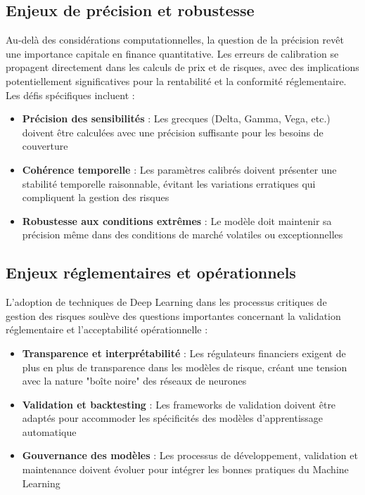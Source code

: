 \subsection{Enjeux de précision et robustesse}

Au-delà des considérations computationnelles, la question de la précision revêt une importance capitale en finance quantitative. Les erreurs de calibration se propagent directement dans les calculs de prix et de risques, avec des implications potentiellement significatives pour la rentabilité et la conformité réglementaire. Les défis spécifiques incluent :

\begin{itemize}
\item \textbf{Précision des sensibilités} : Les grecques (Delta, Gamma, Vega, etc.) doivent être calculées avec une précision suffisante pour les besoins de couverture
\item \textbf{Cohérence temporelle} : Les paramètres calibrés doivent présenter une stabilité temporelle raisonnable, évitant les variations erratiques qui compliquent la gestion des risques
\item \textbf{Robustesse aux conditions extrêmes} : Le modèle doit maintenir sa précision même dans des conditions de marché volatiles ou exceptionnelles
\end{itemize}

\subsection{Enjeux réglementaires et opérationnels}

L'adoption de techniques de Deep Learning dans les processus critiques de gestion des risques soulève des questions importantes concernant la validation réglementaire et l'acceptabilité opérationnelle :

\begin{itemize}
\item \textbf{Transparence et interprétabilité} : Les régulateurs financiers exigent de plus en plus de transparence dans les modèles de risque, créant une tension avec la nature "boîte noire" des réseaux de neurones
\item \textbf{Validation et backtesting} : Les frameworks de validation doivent être adaptés pour accommoder les spécificités des modèles d'apprentissage automatique
\item \textbf{Gouvernance des modèles} : Les processus de développement, validation et maintenance doivent évoluer pour intégrer les bonnes pratiques du Machine Learning
\end{itemize}

